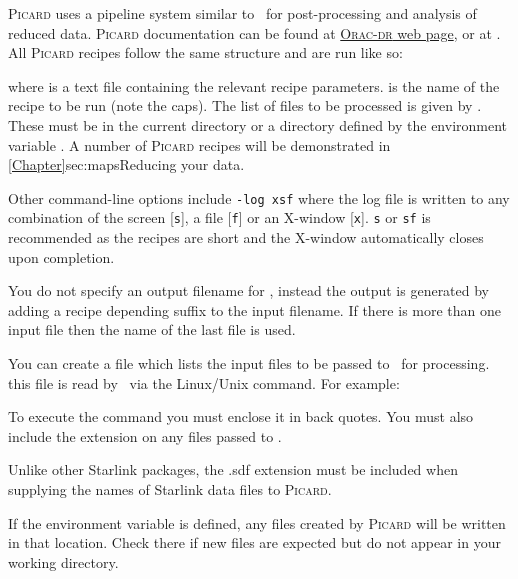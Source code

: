 \textsc{Picard} uses a pipeline system similar to \oracdr\ for
post-processing and analysis of reduced data. \textsc{Picard}
documentation can be found at
\href{http://www.oracdr.org/oracdr/PICARD}{\textsc{Orac-dr} web page},
or at \picardsun. All \textsc{Picard} recipes follow the same
structure and are run like so:
\begin{terminalv}
\end{terminalv}
where  is a text file containing the
relevant recipe parameters.  is the name of the recipe
to be run (note the caps). The list of files to be processed is given
by  . These must be in the current directory or a
directory defined by the environment variable . A
number of \textsc{Picard} recipes will be demonstrated in
\cref{Chapter}{sec:maps}{Reducing your data}.

Other command-line options include \texttt{-log xsf} where the log
file is written to any combination of the screen [\texttt{s}], a file
[\texttt{f}] or an X-window [\texttt{x}]. \texttt{s} or \texttt{sf} is
recommended as the recipes are short and the X-window automatically
closes upon completion.

You do not specify an output filename for \picard, instead the output
is generated by adding a recipe depending suffix to the input
filename. If there is more than one input file then the name of the
last file is used.

You can create a file which lists the input files to be passed to
\picard\ for processing. this file is read by \picard\ via the
Linux/Unix  command. For example:

\begin{terminalv}
\end{terminalv}

To execute the  command you must enclose it in back
quotes. You must also include the  extension on any files
passed to \picard.

\begin{tip}
  Unlike other Starlink packages, the .sdf extension must be included
  when supplying the names of Starlink data files to \textsc{Picard}.
\end{tip}

\begin{tip}
  If the environment variable  is defined, any
  files created by \textsc{Picard} will be written in that
  location. Check there if new files are expected but do not appear in
  your working directory.
\end{tip}


